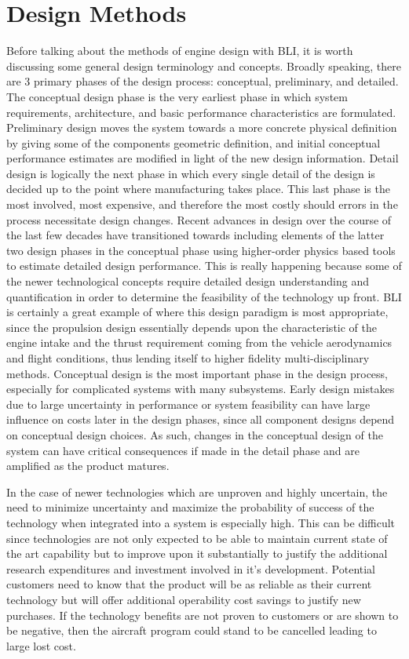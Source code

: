 \section{Design Methods}
Before talking about the methods of engine design with BLI, it is worth discussing some general design terminology and concepts. Broadly speaking, there are 3 primary phases of the design process: conceptual, preliminary, and detailed. The conceptual design phase is the very earliest phase in which system requirements, architecture, and basic performance characteristics are formulated. Preliminary design moves the system towards a more concrete physical definition by giving some of the components geometric definition, and initial conceptual performance estimates are modified in light of the new design information. Detail design is logically the next phase in which every single detail of the design is decided up to the point where manufacturing takes place. This last phase is the most involved, most expensive, and therefore the most costly should errors in the process necessitate design changes. Recent advances in design over the course of the last few decades have transitioned towards including elements of the latter two design phases in the conceptual phase using higher-order physics based tools to estimate detailed design performance. This is really happening because some of the newer technological concepts require detailed design understanding and quantification in order to determine the feasibility of the technology up front.  BLI is certainly a great example of where this design paradigm is most appropriate, since the propulsion design essentially depends upon the characteristic of the engine intake and the thrust requirement coming from the vehicle aerodynamics and flight conditions, thus lending itself to higher fidelity multi-disciplinary methods.  Conceptual design is the most important phase in the design process, especially for complicated systems with many subsystems.  Early design mistakes due to large uncertainty in performance or system feasibility can have large influence on costs later in the design phases, since all component designs depend on conceptual design choices. As such, changes in the conceptual  design of the system can have critical consequences if made in the detail phase and are amplified as the product matures.  

In the case of newer technologies which are unproven and highly uncertain, the need to minimize uncertainty and maximize the probability of success of the technology when integrated into a system is especially high. This can be difficult since technologies are not only expected to be able to maintain current state of the art capability but to improve upon it substantially to justify the additional research expenditures and investment involved in it's development.  Potential customers need to know that the product will be as reliable as their current technology but will offer additional operability cost savings to justify new purchases. If the technology benefits are not proven to customers or are shown to be negative, then the aircraft program could stand to be cancelled leading to large lost cost.  



